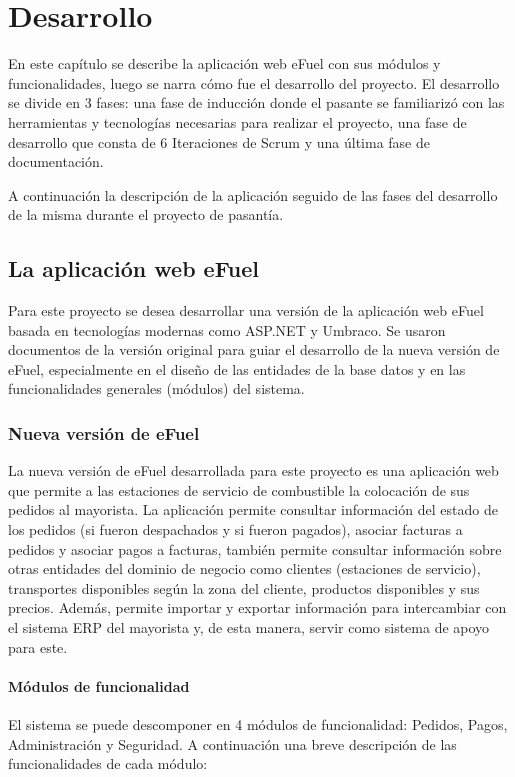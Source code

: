 \chapter{Desarrollo} \label{development}
En este capítulo se describe la aplicación web eFuel con sus módulos y funcionalidades, luego se narra cómo fue el desarrollo del proyecto. El desarrollo se divide en 3 fases: una fase de inducción donde el pasante se familiarizó con las herramientas y tecnologías necesarias para realizar el proyecto, una fase de desarrollo que consta de 6 Iteraciones de Scrum y una última fase de documentación.

A continuación la descripción de la aplicación seguido de las fases del desarrollo de la misma durante el proyecto de pasantía.

\section{La aplicación web eFuel}
Para este proyecto se desea desarrollar una versión de la aplicación web eFuel basada en tecnologías modernas como ASP.NET y Umbraco. Se usaron documentos de la versión original para guiar el desarrollo de la nueva versión de eFuel, especialmente en el diseño de las entidades de la base datos y en las funcionalidades generales (módulos) del sistema.

\subsection{Nueva versión de eFuel}
La nueva versión de eFuel desarrollada para este proyecto es una aplicación web que permite a las estaciones de servicio de combustible la colocación de sus pedidos al mayorista. La aplicación permite consultar información del estado de los pedidos (si fueron despachados y si fueron pagados), asociar facturas a pedidos y asociar pagos a facturas, también permite consultar información sobre otras entidades del dominio de negocio como clientes (estaciones de servicio), transportes disponibles según la zona del cliente, productos disponibles y sus precios. Además, permite importar y exportar información para intercambiar con el sistema ERP del mayorista y, de esta manera, servir como sistema de apoyo para este.

\subsubsection{Módulos de funcionalidad}
El sistema se puede descomponer en 4 módulos de funcionalidad: Pedidos, Pagos, Administración y Seguridad. A continuación una breve descripción de las funcionalidades de cada módulo:


